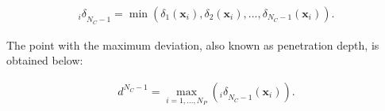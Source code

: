 




\begin{equation}
\begin{aligned}
{_i\delta}_{N_C-1} = \min \left ( \delta_{1}(\boldsymbol{x}_i),\delta_{2}(\boldsymbol{x}_i),...,\delta_{N_C-1}(\boldsymbol{x}_i) \right ) \mbox{.}
\end{aligned}
\label{eqt:dev_min}
\end{equation}

The point with the maximum deviation, also known as penetration depth, is obtained below:

\begin{equation}
\begin{aligned}
d^{N_C-1} = \max_{i=1,...,N_P} \left ( {_i\delta}_{N_C-1}(\boldsymbol{x}_i) \right ) \mbox{.}
\end{aligned}
\label{eqt:dev_max}
\end{equation}


